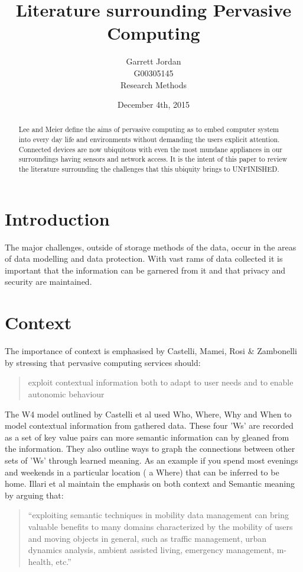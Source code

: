 \documentclass[]{report}
\title{Literature surrounding Pervasive Computing}
\author{Garrett Jordan\\G00305145\\Research Methods}
\date{December 4th, 2015}
\begin{document}
\maketitle


% 
%

\begin{abstract}
Lee and Meier define the aims of pervasive computing as to embed computer system into every day life and environments without demanding the users explicit attention\cite{1}. Connected devices are now ubiquitous with even the most mundane appliances in our surroundings having sensors and network access. It is the intent of this paper to review the literature surrounding the challenges that this ubiquity brings to UNFINISHED.
\end{abstract}

% 
%

\section*{Introduction}
The major challenges, outside of storage methods of the data, occur in the areas of data modelling and data protection. With vast rams of data collected it is important that the information can be garnered from it and that privacy and security are maintained.\\

% 
%

\section*{Context}
The importance of context is emphasised by Castelli, Mamei, Rosi \& Zambonelli by stressing that  pervasive computing services should:
\begin{quote}
exploit contextual information both to adapt to user needs and to enable autonomic behaviour\cite{2}
\end{quote} 

The W4 model outlined by Castelli et al used Who, Where, Why and When to model contextual information from gathered data. These four 'Ws' are recorded as a set of key value pairs can more semantic information can by gleaned from the information. They also outline ways to graph the connections between other sets of 'Ws' through learned meaning. As an example if you spend most evenings and weekends in a particular location ( a Where) that can be inferred to be home.
Illari et al\cite{4} maintain the emphasis on both context and Semantic meaning by arguing that:
\begin{quote}
``exploiting semantic techniques in mobility data management can bring valuable benefits to many domains characterized by the mobility of users and moving objects in general, such as traffic management, urban dynamics analysis, ambient assisted living, emergency management, m-health, etc.''\cite{4}
\end{quote}
\end{document}
